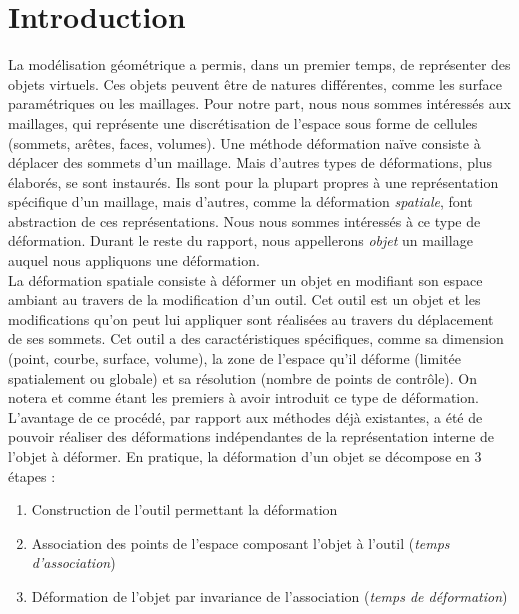 
\chapter{Introduction}

\graphicspath{ {Introduction/IntroductionFigs/PNG/}
  {Introduction/IntroductionFigs/PDF/}
  {Introduction/IntroductionFigs/} }

La modélisation géométrique a permis, dans un premier temps, de représenter des
objets virtuels. Ces objets peuvent être de natures différentes, comme les
surface paramétriques ou les maillages. Pour notre part, nous nous sommes
intéressés aux maillages, qui représente une discrétisation de l'espace sous
forme de cellules (sommets, arêtes, faces, volumes). Une méthode déformation
naïve consiste à déplacer des sommets d'un maillage. Mais d'autres types de
déformations, plus élaborés, se sont instaurés. Ils sont pour la plupart propres
à une représentation spécifique d'un maillage, mais d'autres, comme la
déformation \textit{spatiale}, font abstraction de ces représentations. Nous
nous sommes intéressés à ce type de déformation. Durant le reste du rapport,
nous appellerons \textit{objet} un maillage auquel nous appliquons une
déformation.\\
	
La déformation spatiale consiste à déformer un objet en modifiant son espace
ambiant au travers de la modification d'un outil. Cet outil est un objet et les
modifications qu'on peut lui appliquer sont réalisées au travers du déplacement
de ses sommets. Cet outil a des caractéristiques spécifiques, comme sa dimension
(point, courbe, surface, volume), la zone de l'espace qu'il déforme (limitée
spatialement ou globale) et sa résolution (nombre de points de contrôle). On notera
\cite{Bar84} et \cite{SP86} comme étant les premiers à avoir introduit ce type
de déformation. L'avantage de ce procédé, par rapport aux méthodes déjà
existantes, a été de pouvoir réaliser des déformations indépendantes de la
représentation interne de l'objet à déformer.
\newpage
En pratique, la déformation d'un objet se décompose en 3 étapes :
\begin{enumerate}  

\item Construction de l'outil permettant la déformation

\item Association des points de l'espace composant l'objet à l'outil
(\textit{temps d'association})

\item Déformation de l'objet par invariance de l'association (\textit{temps de
déformation})

\end{enumerate} 

